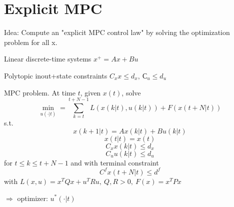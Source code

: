 \section{Explicit MPC}

Idea: Compute an "explicit MPC control law" by solving the optimization problem for all x.

Linear discrete-time systems $x^+=Ax+Bu$

Polytopic inout+state constraints $C_xx \leq d_x, \ С_u \leq d_u$

MPC problem. At time $t$, given $x(t)$, solve
\begin{equation*}
\min_{u(\cdot|t)} = \sum_{k=t}^{t+N-1}L(x(k|t),u(k|t)) + F(x(t+N|t))
\end{equation*}
s.t.
\begin{equation*}
x(k+1|t) = Ax(k|t) + Bu(k|t)
\end{equation*}
\begin{equation*}
x(t|t) = x(t)
\end{equation*}
\begin{equation*}
C_xx(k|t) \leq d_x
\end{equation*}
\begin{equation*}
C_uu(k|t) \leq d_u
\end{equation*}
for $ t \leq k \leq t+N-1$ and with terminal constraint
\begin{equation*}
C^fx(t+N|t) \leq d^f
\end{equation*}
with $L(x,u) = x^TQx + u^TRu, \ Q,R > 0, \ F(x) = x^TPx$

$\Rightarrow$ optimizer: $u^*(\cdot|t)$


